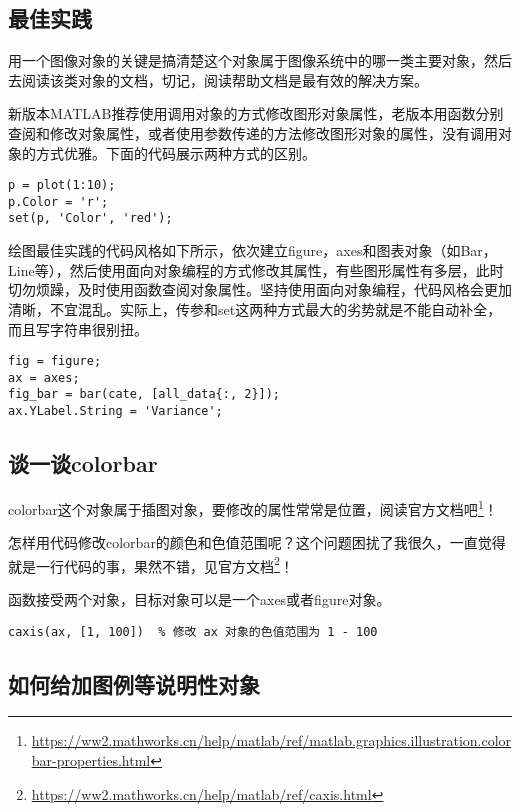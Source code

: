 \subsection{最佳实践}

用一个图像对象的关键是搞清楚这个对象属于图像系统中的哪一类主要对象，然后去阅读该类对象的文档，切记，阅读帮助文档是最有效的解决方案。

新版本MATLAB推荐使用调用对象的方式修改图形对象属性，老版本用函数分别查阅和修改对象属性，或者使用参数传递的方法修改图形对象的属性，没有调用对象的方式优雅。下面的代码展示两种方式的区别。

\begin{verbatim}
p = plot(1:10);
p.Color = 'r';
set(p, 'Color', 'red');
\end{verbatim}

绘图最佳实践的代码风格如下所示，依次建立figure，axes和图表对象（如Bar，Line等），然后使用面向对象编程的方式修改其属性，有些图形属性有多层，此时切勿烦躁，及时使用函数查阅对象属性。坚持使用面向对象编程，代码风格会更加清晰，不宜混乱。实际上，传参和set这两种方式最大的劣势就是不能自动补全，而且写字符串很别扭。

\begin{verbatim}
fig = figure;
ax = axes;
fig_bar = bar(cate, [all_data{:, 2}]);
ax.YLabel.String = 'Variance';
\end{verbatim}

\subsection{谈一谈colorbar}

colorbar这个对象属于插图对象，要修改的属性常常是位置，阅读官方文档吧\footnote{\url{https://ww2.mathworks.cn/help/matlab/ref/matlab.graphics.illustration.colorbar-properties.html}}！

怎样用代码修改colorbar的颜色和色值范围呢？这个问题困扰了我很久，一直觉得就是一行代码的事，果然不错，见官方文档\footnote{\url{https://ww2.mathworks.cn/help/matlab/ref/caxis.html}}！

函数接受两个对象，目标对象可以是一个axes或者figure对象。

\begin{verbatim}
caxis(ax, [1, 100])  % 修改 ax 对象的色值范围为 1 - 100
\end{verbatim}

\subsection{如何给加图例等说明性对象}

